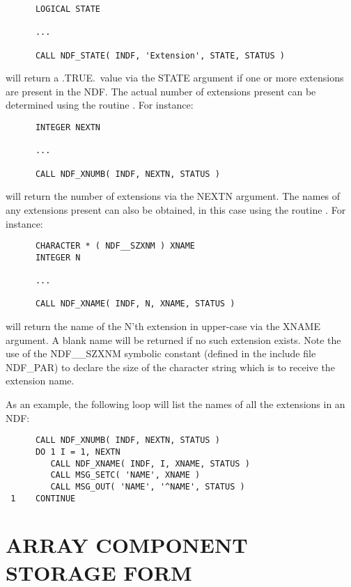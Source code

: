 \small
\begin{verbatim}
      LOGICAL STATE

      ...

      CALL NDF_STATE( INDF, 'Extension', STATE, STATUS )
\end{verbatim}
\normalsize

will return a .TRUE.\ value via the STATE argument if one or more extensions 
are present in the NDF.
The actual number of extensions present can be determined using the routine
. 
For instance:

\small
\begin{verbatim}
      INTEGER NEXTN

      ...

      CALL NDF_XNUMB( INDF, NEXTN, STATUS )
\end{verbatim}
\normalsize

will return the number of extensions via the NEXTN argument.
The names of any extensions present can also be obtained, in this case 
using the routine .
For instance:

\small
\begin{verbatim}
      CHARACTER * ( NDF__SZXNM ) XNAME
      INTEGER N

      ...

      CALL NDF_XNAME( INDF, N, XNAME, STATUS )
\end{verbatim}
\normalsize

will return the name of the N'th extension in upper-case via the XNAME
argument. 
A blank name will be returned if no such extension exists. 
Note the use of the NDF\_\_SZXNM symbolic constant (defined in the include
file NDF\_PAR) to declare the size of the character string which is to
receive the extension name. 

As an example, the following loop will list the names of all the extensions
in an NDF: 

\small
\begin{verbatim}
      CALL NDF_XNUMB( INDF, NEXTN, STATUS )
      DO 1 I = 1, NEXTN
         CALL NDF_XNAME( INDF, I, XNAME, STATUS )
         CALL MSG_SETC( 'NAME', XNAME )
         CALL MSG_OUT( 'NAME', '^NAME', STATUS )
 1    CONTINUE
\end{verbatim}
\normalsize


\section{\label{ss:storageform}ARRAY COMPONENT STORAGE FORM}

